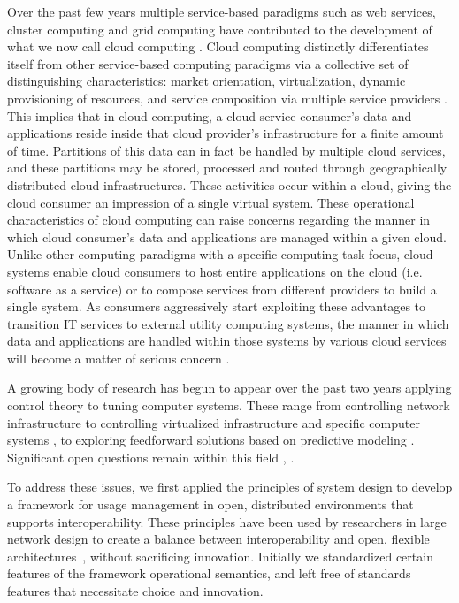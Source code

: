 \documentclass{acm_proc_article-sp}
\begin{document}
Over the past few years multiple service-based paradigms such as web services, cluster computing and grid computing have contributed to the development of what we now call cloud computing \cite{Bu:09}. Cloud computing distinctly differentiates itself from other service-based computing paradigms via a collective set of distinguishing characteristics:  market orientation, virtualization, dynamic provisioning of resources, and service composition via multiple service providers \cite{BuYeVeBrBr:09}. This implies that in cloud computing, a cloud-service consumer's data and applications reside inside that cloud provider's infrastructure for a finite amount of time.  Partitions of this data can in fact be handled by multiple cloud services, and these partitions may be stored, processed and routed through geographically distributed cloud infrastructures. These activities occur within a cloud, giving the cloud consumer an impression of a single virtual system.  These operational characteristics of cloud computing can raise concerns regarding the manner in which cloud consumer's data and applications are managed within a given cloud. Unlike other computing paradigms with a specific computing task focus, cloud systems enable cloud consumers to host entire applications on the cloud (i.e. software as a service) or to compose services from different providers to build a single system. As consumers aggressively start exploiting these advantages to transition IT services to external utility computing systems, the manner in which data and applications are handled within those systems by various cloud services will become a matter of serious concern \cite{Jamkhedkar:2010:IUM:1866870.1866885}.

A growing body of research has begun to appear over the past two years applying control theory to tuning computer systems.  These range from controlling network infrastructure \cite{ctrl:ariba-GL:2009} to controlling virtualized infrastructure and specific computer systems \cite{ctrl:wang-cgswrzh:2009}, \cite{ctrl:kjaer-kr:2009} to exploring feedforward solutions based on predictive modeling \cite{ctrl:abdelwahed-bsk:2009}.  Significant open questions remain within this field \cite{ctrl:Zhu:2009:CTB:1496909.1496922}, \cite{ctrl:hellerstein-sw:2009}.

To address these issues, we first applied the principles of system design to develop a framework for usage management in open, distributed environments that supports interoperability. These principles have been used by researchers in large network design to create a balance between interoperability and open, flexible architectures~\cite{Al:04,BlCl:01,ClWrSoBr:02}, without sacrificing innovation. Initially we standardized certain features of the framework operational semantics, and left free of standards features that necessitate choice and innovation.
\end{document}
